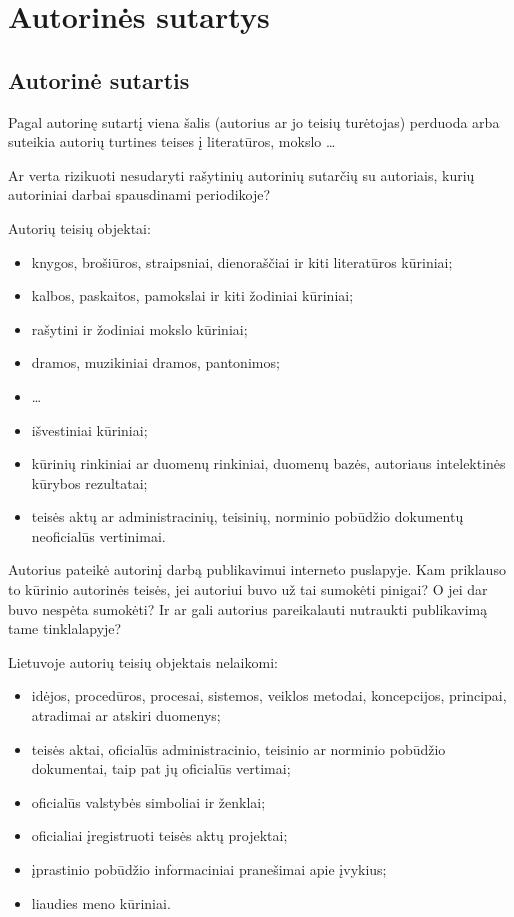 \chapter{Autorinės sutartys}

\section{Autorinė sutartis}

Pagal autorinę sutartį viena šalis (autorius ar jo teisių turėtojas)
perduoda arba suteikia autorių turtines teises į literatūros, mokslo
…

\begin{exmp}
  Ar verta rizikuoti nesudaryti rašytinių autorinių sutarčių su autoriais,
  kurių autoriniai darbai spausdinami periodikoje?
\end{exmp}

Autorių teisių objektai:
\begin{itemize}
  \item knygos, brošiūros, straipsniai, dienoraščiai ir kiti literatūros
    kūriniai;
  \item kalbos, paskaitos, pamokslai ir kiti žodiniai kūriniai;
  \item rašytini ir žodiniai mokslo kūriniai;
  \item dramos, muzikiniai dramos, pantonimos;
  \item …
  \item išvestiniai kūriniai;
  \item kūrinių rinkiniai ar duomenų rinkiniai, duomenų bazės,
    autoriaus intelektinės kūrybos rezultatai;
  \item teisės aktų ar administracinių, teisinių, norminio pobūdžio
    dokumentų neoficialūs vertinimai.
\end{itemize}

\begin{exmp}
  Autorius pateikė autorinį darbą publikavimui interneto puslapyje.
  Kam priklauso to kūrinio autorinės teisės, jei autoriui buvo už
  tai sumokėti pinigai? O jei dar buvo nespėta sumokėti? Ir ar gali
  autorius pareikalauti nutraukti publikavimą tame tinklalapyje?
\end{exmp}

Lietuvoje autorių teisių objektais nelaikomi:
\begin{itemize}
  \item idėjos, procedūros, procesai, sistemos, veiklos metodai,
    koncepcijos, principai, atradimai ar atskiri duomenys;
  \item teisės aktai, oficialūs administracinio, teisinio ar norminio
    pobūdžio dokumentai, taip pat jų oficialūs vertimai;
  \item oficialūs valstybės simboliai ir ženklai;
  \item oficialiai įregistruoti teisės aktų projektai;
  \item įprastinio pobūdžio informaciniai pranešimai apie įvykius;
  \item liaudies meno kūriniai.
\end{itemize}

